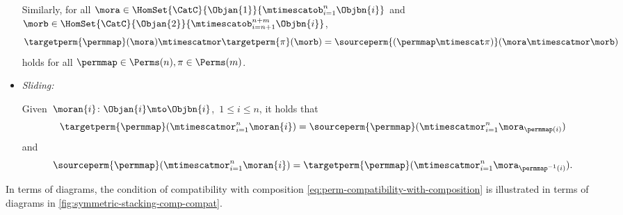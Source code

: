 \begin{ctdefinition}
\begin{itemize}
              Similarly, for all $\mora \in \HomSet{\CatC}{\Objan{1}}{\mtimescatob_{i=1}^n \Objbn{i}} $ and $\morb \in \HomSet{\CatC}{\Objan{2}}{\mtimescatob_{i=n+1}^{n+m} \Objbn{i}}$,
              \begin{equation}
                  \targetperm{\permmap}(\mora) \mtimescatmor \targetperm{\pi}(\morb) = \sourceperm{(\permmap \mtimescat \pi)}(\mora \mtimescatmor \morb)
              \end{equation}
              holds for all $\permmap \in \Perms(n), \pi \in \Perms(m)$.

        \item \emph{Sliding:}

              Given~$\moran{i} \colon \Objan{i} \mto \Objbn{i}$,~$1 \leq i \leq n$, it holds that
              \begin{equation}
                  \label{eq:perm-compatibility-with-stacking-1}
                  \targetperm{\permmap} ( \mtimescatmor_{i=1}^n \moran{i} ) = \sourceperm{\permmap}( \mtimescatmor_{i=1}^n \mora_{\permmap(i)} )
              \end{equation}
              and
              \begin{equation}
                  \label{eq:perm-compatibility-with-stacking-2}
                  \sourceperm{\permmap} ( \mtimescatmor_{i=1}^n \moran{i} ) = \targetperm{\permmap} ( \mtimescatmor_{i=1}^n \mora_{\permmap^{-1}(i)} ).
              \end{equation}

    \end{itemize}
\end{ctdefinition}




In terms of diagrams, the condition of compatibility with composition \cref{eq:perm-compatibility-with-composition} is illustrated in terms of diagrams in \cref{fig:symmetric-stacking-comp-compat}.


